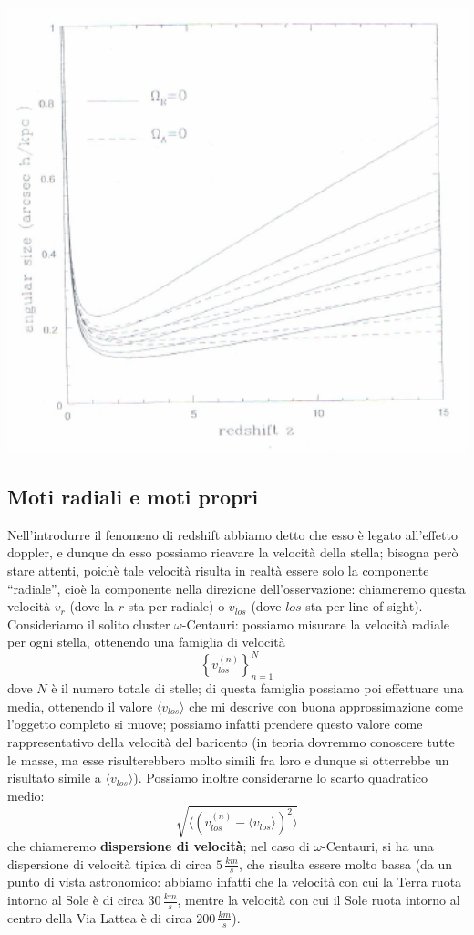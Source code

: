 \begin{minipage}{.40\textwidth}
	\centering
	\includegraphics[width=1\textwidth]{Img/bertin_6bis.png}
\end{minipage}

\subsection{Moti radiali e moti propri}
Nell'introdurre il fenomeno di redshift abbiamo detto che esso è legato all'effetto doppler, e dunque da esso possiamo ricavare la velocità della stella; bisogna però stare attenti, poichè tale velocità risulta in realtà essere solo la componente ``radiale'', cioè la componente nella direzione dell'osservazione: chiameremo questa velocità $v_r$ (dove la $r$ sta per radiale) o $v_{los}$ (dove $los$ sta per line of sight).
\\
Consideriamo il solito cluster $\omega$-Centauri: possiamo misurare la velocità radiale per ogni stella, ottenendo una famiglia di velocità
$$\left\{ v_{los} ^{(n)} \right\}_{n=1} ^N$$
dove $N$ è il numero totale di stelle; di questa famiglia possiamo poi effettuare una media, ottenendo il valore $\langle v_{los} \rangle$  che mi descrive con buona approssimazione come l'oggetto completo si muove; possiamo infatti prendere questo valore come rappresentativo della velocità del baricento (in teoria dovremmo conoscere tutte le masse, ma esse risulterebbero molto simili fra loro e dunque si otterrebbe un risultato simile a $\langle v_{los} \rangle$). Possiamo inoltre considerarne lo scarto quadratico medio: $$\sqrt{\langle \left(v_{los}^{(n)}- \langle v_{los} \rangle \right)^2 \rangle}$$
che chiameremo \textbf{dispersione di velocità}; nel caso di $\omega$-Centauri, si ha una dispersione di velocità tipica di circa $5 \, \frac{km}{s}$, che risulta essere molto bassa (da un punto di vista astronomico: abbiamo infatti che la velocità con cui la Terra ruota intorno al Sole è di circa $30 \, \frac{km}{s}$, mentre la velocità con cui il Sole ruota intorno al centro della Via Lattea è di circa $200 \, \frac{km}{s}$).

